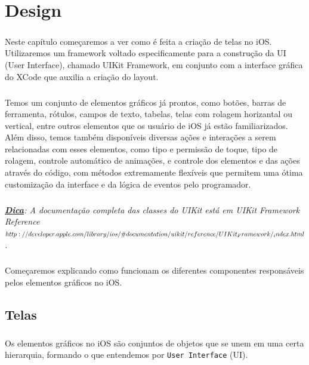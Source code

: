 \documentclass[a4paper,12pt,brazil,doubleside]{book}
\begin{document}
\chapter{Design}

\paragraph{}Neste capítulo começaremos a ver como é feita a criação de telas no iOS. Utilizaremos um framework voltado especificamente para a construção da UI (User Interface), chamado UIKit Framework, em conjunto com a interface gráfica do XCode que auxilia a criação do layout.
\paragraph{}Temos um conjunto de elementos gráficos já prontos, como botões, barras de ferramenta, rótulos, campos de texto, tabelas, telas com rolagem horizantal ou vertical, entre outros elementos que os usuário de iOS já estão familiarizados. Além disso, temos também disponíveis diversas ações e interações a serem relacionadas com esses elementos, como tipo e permissão de toque, tipo de rolagem, controle automático de animações, e controle dos elementos e das ações através do código, com métodos extremamente flexíveis que permitem uma ótima customização da interface e da lógica de eventos pelo programador.

\paragraph{}\textit{\textbf{\underline{Dica}}: A documentação completa das classes do UIKit está em 
UIKit Framework Reference\\ \(http://developer.apple.com/library/ios/\#documentation/uikit/reference/\\UIKit_Framework/_index.html\).}

\paragraph{}Começaremos explicando como funcionam os diferentes componentes responsáveis pelos elementos gráficos no iOS.

\bigskip
\bigskip


\section{Telas}

\paragraph{}Os elementos gráficos no iOS são conjuntos de objetos que se unem em uma certa hierarquia, formando o que entendemos por \texttt{User Interface} (UI).
\end{document}
